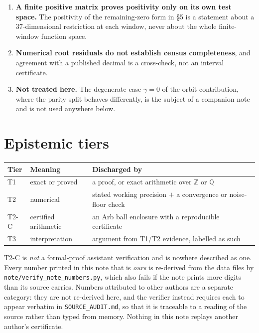 \documentclass[11pt,a4paper]{article}
\theoremstyle{definition}
\theoremstyle{remark}
\newcommand{\src}[1]{{\footnotesize\texttt{#1}}}
\begin{document}
\begin{enumerate}
\item \textbf{A finite positive matrix proves positivity only on its own test space.} The
positivity of the remaining-zero form in \S5 is a statement about a $37$-dimensional
restriction at each window, never about the whole finite-window function space.

\item \textbf{Numerical root residuals do not establish census completeness}, and
agreement with a published decimal is a cross-check, not an interval certificate.

\item \textbf{Not treated here.} The degenerate case $\gamma = 0$ of the orbit
contribution, where the parity split behaves differently, is the subject of a companion
note and is not used anywhere below.
\end{enumerate}

\section*{Epistemic tiers}

\begin{center}
\begin{tabular}{@{}lll@{}}
\toprule
Tier & Meaning & Discharged by \\
\midrule
T1 & exact or proved & a proof, or exact arithmetic over $\mathbb{Z}$ or $\mathbb{Q}$ \\
T2 & numerical & stated working precision $+$ a convergence or noise-floor check \\
T2-C & certified arithmetic & an Arb ball enclosure with a reproducible certificate \\
T3 & interpretation & argument from T1/T2 evidence, labelled as such \\
\bottomrule
\end{tabular}
\end{center}

\noindent T2-C is \emph{not} a formal-proof assistant verification and is nowhere
described as one. Every number printed in this note that is \emph{ours} is re-derived
from the data files by \src{note/verify\_note\_numbers.py}, which also fails if the note
prints more digits than its source carries. Numbers attributed to other authors are a
separate category: they are not re-derived here, and the verifier instead requires each to
appear verbatim in \src{SOURCE\_AUDIT.md}, so that it is traceable to a reading of the
source rather than typed from memory. Nothing in this note replays another author's
certificate.
\end{document}
